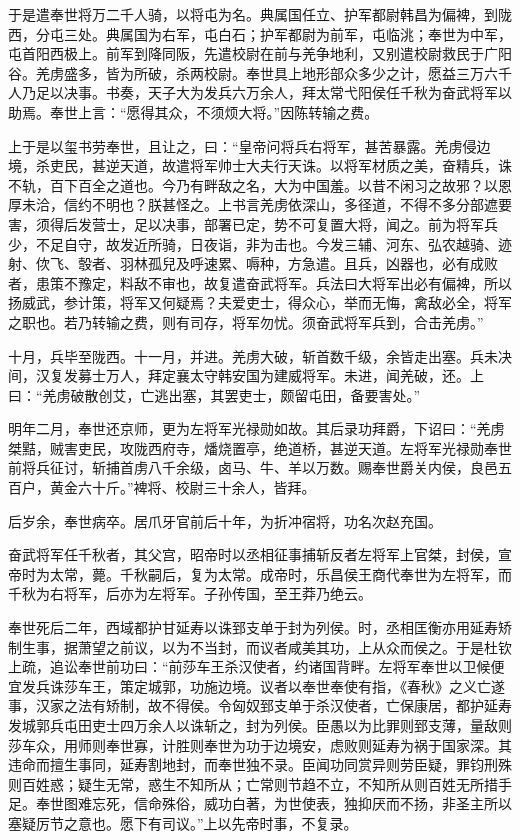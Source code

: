 \documentclass[12pt,UTF8]{ctexbook}
\begin{document}
于是遣奉世将万二千人骑，以将屯为名。典属国任立、护军都尉韩昌为偏裨，到陇西，分屯三处。典属国为右军，屯白石；护军都尉为前军，屯临洮；奉世为中军，屯首阳西极上。前军到降同阪，先遣校尉在前与羌争地利，又别遣校尉救民于广阳谷。羌虏盛多，皆为所破，杀两校尉。奉世具上地形部众多少之计，愿益三万六千人乃足以决事。书奏，天子大为发兵六万余人，拜太常弋阳侯任千秋为奋武将军以助焉。奉世上言：“愿得其众，不须烦大将。”因陈转输之费。



上于是以玺书劳奉世，且让之，曰：“皇帝问将兵右将军，甚苦暴露。羌虏侵边境，杀吏民，甚逆天道，故遣将军帅士大夫行天诛。以将军材质之美，奋精兵，诛不轨，百下百全之道也。今乃有畔敌之名，大为中国羞。以昔不闲习之故邪？以恩厚未洽，信约不明也？朕甚怪之。上书言羌虏依深山，多径道，不得不多分部遮要害，须得后发营士，足以决事，部署已定，势不可复置大将，闻之。前为将军兵少，不足自守，故发近所骑，日夜诣，非为击也。今发三辅、河东、弘农越骑、迹射、佽飞、彀者、羽林孤兒及呼速累、嗕种，方急遣。且兵，凶器也，必有成败者，患策不豫定，料敌不审也，故复遣奋武将军。兵法曰大将军出必有偏裨，所以扬威武，参计策，将军又何疑焉？夫爱吏士，得众心，举而无悔，禽敌必全，将军之职也。若乃转输之费，则有司存，将军勿忧。须奋武将军兵到，合击羌虏。”



十月，兵毕至陇西。十一月，并进。羌虏大破，斩首数千级，余皆走出塞。兵未决间，汉复发募士万人，拜定襄太守韩安国为建威将军。未进，闻羌破，还。上曰：“羌虏破散创艾，亡逃出塞，其罢吏士，颇留屯田，备要害处。”



明年二月，奉世还京师，更为左将军光禄勋如故。其后录功拜爵，下诏曰：“羌虏桀黠，贼害吏民，攻陇西府寺，燔烧置亭，绝道桥，甚逆天道。左将军光禄勋奉世前将兵征讨，斩捕首虏八千余级，卤马、牛、羊以万数。赐奉世爵关内侯，良邑五百户，黄金六十斤。”裨将、校尉三十余人，皆拜。



后岁余，奉世病卒。居爪牙官前后十年，为折冲宿将，功名次赵充国。



奋武将军任千秋者，其父宫，昭帝时以丞相征事捕斩反者左将军上官桀，封侯，宣帝时为太常，薨。千秋嗣后，复为太常。成帝时，乐昌侯王商代奉世为左将军，而千秋为右将军，后亦为左将军。子孙传国，至王莽乃绝云。



奉世死后二年，西域都护甘延寿以诛郅支单于封为列侯。时，丞相匡衡亦用延寿矫制生事，据萧望之前议，以为不当封，而议者咸美其功，上从众而侯之。于是杜钦上疏，追讼奉世前功曰：“前莎车王杀汉使者，约诸国背畔。左将军奉世以卫候便宜发兵诛莎车王，策定城郭，功施边境。议者以奉世奉使有指，《春秋》之义亡遂事，汉家之法有矫制，故不得侯。令匈奴郅支单于杀汉使者，亡保康居，都护延寿发城郭兵屯田吏士四万余人以诛斩之，封为列侯。臣愚以为比罪则郅支薄，量敌则莎车众，用师则奉世寡，计胜则奉世为功于边境安，虑败则延寿为祸于国家深。其违命而擅生事同，延寿割地封，而奉世独不录。臣闻功同赏异则劳臣疑，罪钧刑殊则百姓惑；疑生无常，惑生不知所从；亡常则节趋不立，不知所从则百姓无所措手足。奉世图难忘死，信命殊俗，威功白著，为世使表，独抑厌而不扬，非圣主所以塞疑厉节之意也。愿下有司议。”上以先帝时事，不复录。
\end{document}
